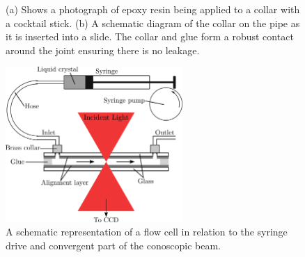 \begin{figure}
\begin{center}
\hspace{0.5in}
\end{center}
\caption[Flow cell connections]{\label{fig:collar}(a) Shows a photograph of epoxy resin being applied to a collar with a cocktail stick. (b) A schematic diagram of the collar on the pipe as it is inserted into a slide. The collar and glue form a robust contact around the joint ensuring there is no leakage.}
\end{figure}

\begin{figure}
\begin{center}
\includegraphics[width=0.6\textwidth]{Figures/Theory/cell_cono}
\end{center}
\caption[Schematic depiction of flow cell in the conoscope]{\label{fig:conoscope_schem1} A schematic representation of a flow cell in relation to the syringe drive and convergent part of the conoscopic beam.}
\end{figure}


